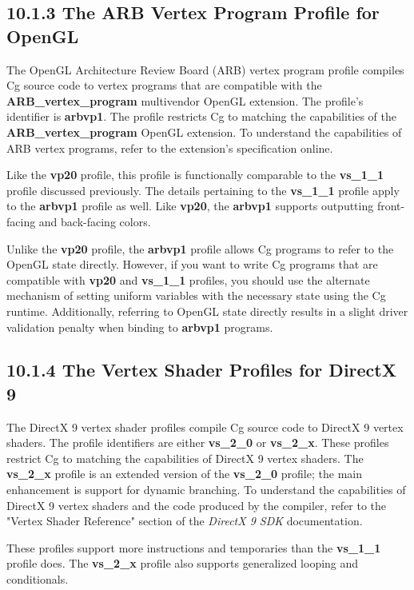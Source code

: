 \documentclass[../main.tex]{subfiles}
\begin{document}
\subsection{10.1.3 The ARB Vertex Program Profile for OpenGL}

The OpenGL Architecture Review Board (ARB) vertex program profile compiles Cg source code to vertex programs that are compatible with the \textbf{ARB_vertex_program} multivendor OpenGL extension. The profile's identifier is \textbf{arbvp1}. The profile restricts Cg to matching the capabilities of the \textbf{ARB_vertex_program} OpenGL extension. To understand the capabilities of ARB vertex programs, refer to the extension's specification online.

Like the \textbf{vp20} profile, this profile is functionally comparable to the \textbf{vs_1_1} profile discussed previously. The details pertaining to the \textbf{vs_1_1} profile apply to the \textbf{arbvp1} profile as well. Like \textbf{vp20}, the \textbf{arbvp1} supports outputting front-facing and back-facing colors.

Unlike the \textbf{vp20} profile, the \textbf{arbvp1} profile allows Cg programs to refer to the OpenGL state directly. However, if you want to write Cg programs that are compatible with \textbf{vp20} and \textbf{vs_1_1} profiles, you should use the alternate mechanism of setting uniform variables with the necessary state using the Cg runtime. Additionally, referring to OpenGL state directly results in a slight driver validation penalty when binding to \textbf{arbvp1} programs.

\subsection{10.1.4 The Vertex Shader Profiles for DirectX 9}

The DirectX 9 vertex shader profiles compile Cg source code to DirectX 9 vertex shaders. The profile identifiers are either \textbf{vs_2_0} or \textbf{vs_2_x}. These profiles restrict Cg to matching the capabilities of DirectX 9 vertex shaders. The \textbf{vs_2_x} profile is an extended version of the \textbf{vs_2_0} profile; the main enhancement is support for dynamic branching. To understand the capabilities of DirectX 9 vertex shaders and the code produced by the compiler, refer to the "Vertex Shader Reference" section of the \textit{DirectX 9 SDK} documentation.

These profiles support more instructions and temporaries than the \textbf{vs_1_1} profile does. The \textbf{vs_2_x} profile also supports generalized looping and conditionals.
\end{document}
